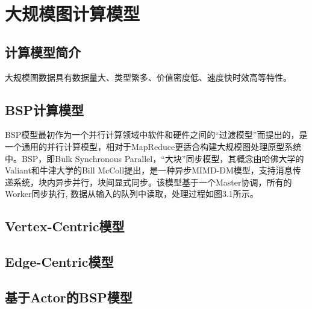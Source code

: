 
\chapter{大规模图计算模型}

\section{计算模型简介}

大规模图数据具有数据量大、类型繁多、价值密度低、速度快时效高等特性。


\section{BSP计算模型}


BSP模型最初作为一个并行计算领域中软件和硬件之间的“过渡模型”而提出的，是一个通用的并行计算模型，相对于MapReduce更适合构建大规模图处理原型系统中。BSP，即Bulk Synchronous Parallel，“大块”同步模型，其概念由哈佛大学的Valiant和牛津大学的Bill McColl提出，是一种异步MIMD-DM模型，支持消息传递系统，块内异步并行，块间显式同步。该模型基于一个Master协调，所有的Worker同步执行, 数据从输入的队列中读取，处理过程如图3.1所示。

\section{Vertex-Centric模型}

\section{Edge-Centric模型}

\section{基于Actor的BSP模型}


